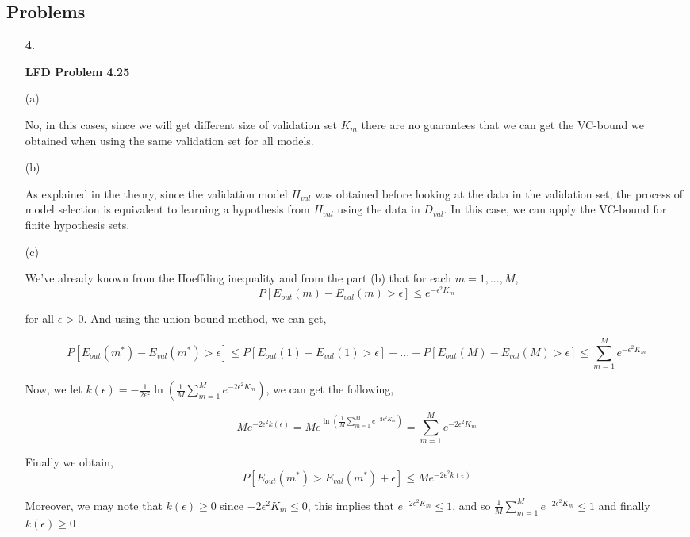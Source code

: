 \documentclass[11pt]{article}
\begin{document}
\pagebreak

\subsection*{Problems}
\begin{enumerate}

\item[\textbf{4.}]

\textbf{LFD Problem 4.25}

(a)

No, in this cases, since we will get different size of validation set $K_m$ there are no guarantees that we can get the VC-bound we obtained when using the same validation set for all models. 

(b)

As explained in the theory, since the validation model $H_{val}$ was obtained before looking at the data in the validation set, the process of model selection is equivalent to learning a hypothesis from $H_{val}$ using the data in $D_{val}$. In this case, we can apply the VC-bound for finite hypothesis sets.

(c)

We've already known from the Hoeffding inequality and from the part (b) that for each $m = 1, ..., M$,
$$P[E_{out}(m) - E_{val}(m) > \epsilon] \leq e^{-\epsilon^2K_m}$$

for all $\epsilon$ > 0. And using the union bound method, we can get, 

$$P[E_{out}(m^*) - E_{val}(m^*) > \epsilon] \leq P[E_{out}(1) - E_{val}(1) > \epsilon] + ... + P[E_{out}(M) - E_{val}(M) > \epsilon] \leq \sum_{m=1}^{M}e^{-\epsilon^2K_m}$$

Now, we let $k(\epsilon)= -\frac{1}{2\epsilon^2}\ln(\frac{1}{M}\sum_{m=1}^{M}e^{-2\epsilon^2K_m})$, we can get the following, 

$$Me^{-2\epsilon^2k(\epsilon)} = Me^{\ln(\frac{1}{M}\sum_{m=1}^{M}e^{-2\epsilon^2K_m})} = \sum_{m=1}^{M}e^{-2\epsilon^2K_m}$$

Finally we obtain, $$P[E_{out}(m^*) > E_{val}(m^*) + \epsilon] \leq Me^{-2\epsilon^2k(\epsilon)}$$

Moreover, we may note that $k(\epsilon) \geq 0$ since $-2\epsilon^2K_m \leq 0$, this implies that $e^{-2\epsilon^2K_m}\leq 1$, and so $\frac{1}{M}\sum_{m=1}^{M}e^{-2\epsilon^2K_m}\leq 1$ and finally $k(\epsilon)\geq 0$




\end{enumerate}
\pagebreak
\end{document}
